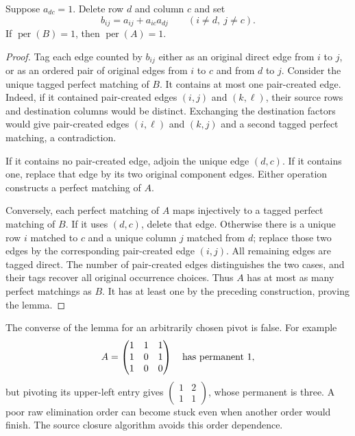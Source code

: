 \begin{lemma}
\label{lem:positive-pivot}
Suppose $a_{dc}=1$. Delete row $d$ and column $c$ and set
\[
 b_{ij}=a_{ij}+a_{ic}a_{dj}\qquad(i\ne d,\ j\ne c).
\]
If $\operatorname{per}(B)=1$, then $\operatorname{per}(A)=1$.
\end{lemma}

\begin{proof}
Tag each edge counted by $b_{ij}$ either as an original direct edge from
$i$ to $j$, or as an ordered pair of original edges from $i$ to $c$ and
from $d$ to $j$. Consider the unique tagged perfect matching of $B$.
It contains at most one pair-created edge. Indeed, if it contained
pair-created edges $(i,j)$ and $(k,\ell)$, their source rows and destination
columns would be distinct. Exchanging the destination factors would give
pair-created edges $(i,\ell)$ and $(k,j)$ and a second tagged perfect
matching, a contradiction.

If it contains no pair-created edge, adjoin the unique edge $(d,c)$.
If it contains one, replace that edge by its two original component edges.
Either operation constructs a perfect matching of $A$.

Conversely, each perfect matching of $A$ maps injectively to a tagged
perfect matching of $B$. If it uses $(d,c)$, delete that edge. Otherwise
there is a unique row $i$ matched to $c$ and a unique column $j$ matched
from $d$; replace those two edges by the corresponding pair-created edge
$(i,j)$. All remaining edges are tagged direct. The number of pair-created
edges distinguishes the two cases, and their tags recover all original
occurrence choices. Thus $A$ has at most as many perfect matchings as
$B$. It has at least one by the preceding construction, proving the lemma.
\end{proof}

The converse of the lemma for an arbitrarily chosen pivot is false. For
example
\[
 A=\begin{pmatrix}1&1&1\\1&0&1\\1&0&0\end{pmatrix}
 \quad\hbox{has permanent }1,
\]
but pivoting its upper-left entry gives
$\left(\begin{smallmatrix}1&2\\1&1\end{smallmatrix}\right)$, whose permanent
is three. A poor raw elimination order can become stuck even when another
order would finish. The source closure algorithm avoids this order dependence.

